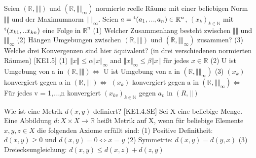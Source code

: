 \documentclass[a6paper
	,10pt
	,grid=none
]{kartei}
\begin{document}
\begin{karte}
	[Normen]
	{
		Seien $(\mathbb{R},\Vert \Vert)$ und $(\mathbb{R},\Vert \Vert_\infty)$ normierte reelle Räume mit einer beliebigen Norm $\Vert \Vert$ und der Maximumnorm $\Vert \ \Vert_\infty$.
		Seien $a = \textsuperscript{t}(a_1,...,a_n) \in \mathbb{R}^n$, 
		$(x_k)_{k\in \mathbb{N}}$ mit $\textsuperscript{t}(x_{k1},..x_{kn})$ eine Folge in $\mathbb{R}^n$
		\newline\newline
		(1) Welcher Zusammenhang besteht zwischen $\Vert\Vert$ und $\Vert\Vert_\infty$ \newline\newline\newline\newline
		(2) Hängen Umgebungen zwischen $(\mathbb{R},\Vert \Vert)$ und $(\mathbb{R},\Vert \Vert_\infty)$ zusammen?\newline\newline\newline\newline
		(3) Welche drei Konvergenzen sind hier äquivalent? (in drei verschiedenen normierten Räumen)
	}
	[KE1.5]
	{
		(1) $\Vert x\Vert \leq \alpha \Vert x\Vert_\infty$ and $\Vert x\Vert_\infty \leq \beta \Vert x\Vert$ für jedes $x\in\mathbb{R}$
		\newline\newline\newline\newline
		(2) U ist Umgebung von a in $(\mathbb{R},\Vert \Vert) \Leftrightarrow$  U ist Umgebung von a in $(\mathbb{R},\Vert \Vert_\infty)$ 
		\newline\newline\newline\newline
		(3) $(x_k)$ konvergiert gegen a in $ (\mathbb{R},\Vert \Vert) \Leftrightarrow $ $(x_k)$ konvergiert gegen a in $ (\mathbb{R},\Vert \Vert_\infty) \Leftrightarrow $ Für jedes v = 1,...,n konvergiert $(x_{kv})_{k\in\mathbb{N}}$ gegen $a_v$ in $(R,||)$
	}
\end{karte}

\begin{karte}
	[Metrik]
	{
		Wie ist eine Metrik $d(x,y)$ definiert?
	}
	[KE1.4.SE]
	{
		Sei X eine beliebige Menge. Eine Abbildung $d : X \times X \rightarrow \mathbb{R}$ heißt Metrik auf X, wenn für beliebige Elemente $x, y, z \in X$ die folgenden Axiome erfüllt sind:
		\newline\newline\newline
		(1) Positive Definitheit: 	$d(x,y) \geq 0$ und $d(x,y)=0 \Leftrightarrow x=y$
		\newline\newline\newline
		(2) Symmetrie: 	$d(x,y)=d(y,x)$
		\newline\newline\newline
		(3) Dreiecksungleichung: $d(x,y) \leq d(x,z)+d(z,y)$ 
	}
\end{karte}
\end{document}
